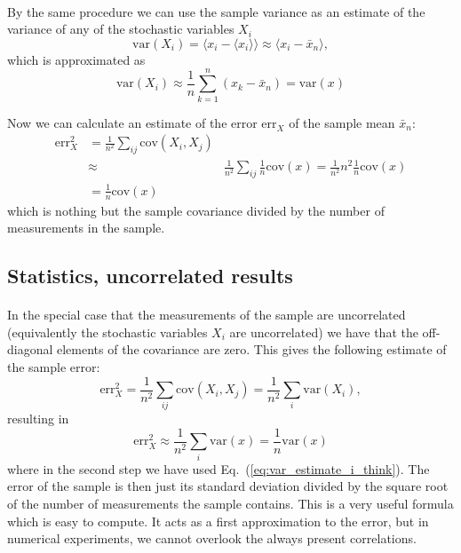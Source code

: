 \documentclass[%
oneside,                 %
final,                   %
10pt]{article}
\begin{document}
\paragraph{}
By the same procedure we can use the sample variance as an
estimate of the variance of any of the stochastic variables $X_i$
\[
\mathrm{var}(X_i)=\langle x_i - \langle x_i\rangle\rangle \approx \langle x_i - \bar x_n\rangle\nonumber,
\]
which is approximated as 
\begin{equation}
\mathrm{var}(X_i)\approx \frac{1}{n}\sum_{k=1}^n (x_k - \bar x_n)=\mathrm{var}(x)
\label{eq:var_estimate_i_think}
\end{equation}

Now we can calculate an estimate of the error
$\mathrm{err}_X^{\phantom X}$ of the sample mean $\bar x_n$:
\begin{align}
\mathrm{err}_X^2
&=\frac{1}{n^2}\sum_{ij} \mathrm{cov}(X_i, X_j) \nonumber \\
&\approx&\frac{1}{n^2}\sum_{ij}\frac{1}{n}\mathrm{cov}(x) =\frac{1}{n^2}n^2\frac{1}{n}\mathrm{cov}(x)\nonumber\\
&=\frac{1}{n}\mathrm{cov}(x)
\label{eq:error_estimate}
\end{align}
which is nothing but the sample covariance divided by the number of
measurements in the sample.



\subsection*{Statistics, uncorrelated results}

\paragraph{}

In the special case that the measurements of the sample are
uncorrelated (equivalently the stochastic variables $X_i$ are
uncorrelated) we have that the off-diagonal elements of the covariance
are zero. This gives the following estimate of the sample error:
\[
\mathrm{err}_X^2=\frac{1}{n^2}\sum_{ij} \mathrm{cov}(X_i, X_j) =
\frac{1}{n^2} \sum_i \mathrm{var}(X_i),
\]
resulting in
\begin{equation}
\mathrm{err}_X^2\approx \frac{1}{n^2} \sum_i \mathrm{var}(x)= \frac{1}{n}\mathrm{var}(x)
\label{eq:error_estimate_uncorrel}
\end{equation}
where in the second step we have used Eq.~(\ref{eq:var_estimate_i_think}).
The error of the sample is then just its standard deviation divided by
the square root of the number of measurements the sample contains.
This is a very useful formula which is easy to compute. It acts as a
first approximation to the error, but in numerical experiments, we
cannot overlook the always present correlations.
\end{document}
